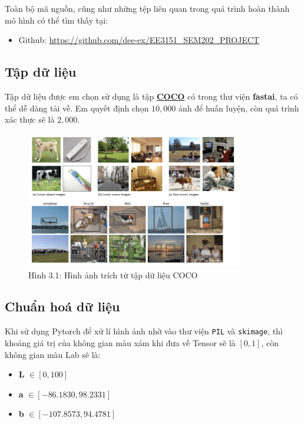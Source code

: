 \documentclass[a4paper]{article}
\begin{document}
\noindent
Toàn bộ mã nguồn, cũng như những tệp liên quan trong quá trình hoàn thành mô hình có thể tìm thấy tại:
\begin{itemize}
    \item Github: \href{https://github.com/dee-ex/EE3151\_SEM202\_PROJECT}{https://github.com/dee-ex/EE3151\_SEM202\_PROJECT}
\end{itemize}

\subsection{Tập dữ liệu}
Tập dữ liệu được em chọn sử dụng là tập \href{https://cocodataset.org/#download}{\textbf{COCO}} có trong thư viện \textbf{fastai}, ta có thể dễ dàng tải về. Em quyết định chọn $10,000$ ảnh để huấn luyện, còn quá trình xác thực sẽ là $2,000$.

\begin{figure}[h!]
\centering
\includegraphics[width=9.5cm]{images/3_1.png}
\caption{Hình 3.1: Hình ảnh trích từ tập dữ liệu COCO}
\end{figure}

\subsection{Chuẩn hoá dữ liệu}\label{normalization}
\noindent
Khi sử dụng Pytorch để xử lí hình ảnh nhờ vào thư viện \texttt{PIL} và \texttt{skimage}, thì khoảng giá trị của không gian màu xám khi đưa về Tensor sẽ là $[0, 1]$, còn không gian màu Lab sẽ là:

\begin{itemize}
    \item \textbf{L} $\in [0, 100]$
    
    \item \textbf{a} $\in [-86.1830, 98.2331]$
    
    \item \textbf{b} $\in [-107.8573, 94.4781]$
\end{itemize}
\end{document}
